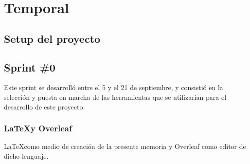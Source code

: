 \chapter{Temporal}
    \section{Setup del proyecto}
    
    \section{Sprint \#0}
        Este sprint se desarrolló entre el 5 y el 21 de septiembre, y consistió en la selección y puesta en marcha de las herramientas que se utilizarían para el desarrollo de este proyecto.  
        
        \subsection{\LaTeX y Overleaf}
        \LaTeX como medio de creación de la presente memoria y Overleaf como editor de dicho lenguaje.
            